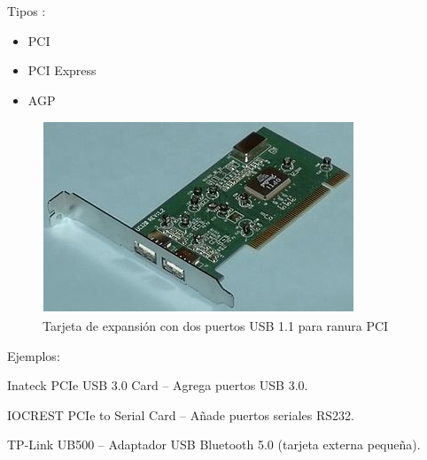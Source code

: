 Tipos \cite{josito}:

\begin{itemize}
  \item PCI
  \item PCI Express
  \item AGP
\end{itemize}

\begin{figure}
  \centering
  \includegraphics[scale=0.9]{imagenes/tarjeta-expansion.png}
  \caption{Tarjeta de expansión con dos puertos USB 1.1 para ranura PCI}
\end{figure}

Ejemplos:

Inateck PCIe USB 3.0 Card – Agrega puertos USB 3.0.

IOCREST PCIe to Serial Card – Añade puertos seriales RS232.

TP-Link UB500 – Adaptador USB Bluetooth 5.0 (tarjeta externa pequeña).
